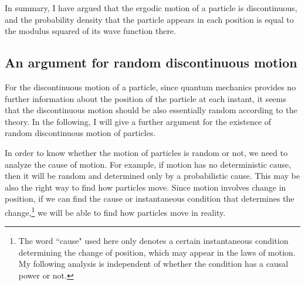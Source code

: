 In summary, I have argued that the ergodic motion of a particle is discontinuous, and the probability density that the particle appears in each position is equal to the modulus squared of its wave function there.

\subsection{An argument for random discontinuous motion}

For the discontinuous motion of a particle, since quantum mechanics provides no further information about the position of the particle at each instant, it seems that the discontinuous motion should be also essentially random according to the theory. 
In the following, I will give a further argument for the existence of random discontinuous motion of particles.

In order to know whether the motion of particles is random or not, we need to analyze the cause of motion. For example, if motion has no deterministic cause, then it will be  random and determined only by a probabilistic cause. This may be also the right way to find how particles move. Since motion involves change in position, if we can find the cause or instantaneous condition that determines the change,\footnote{The word ``cause" used here only denotes a certain instantaneous condition determining the change of position, which may appear in the laws of motion. My following analysis is independent of whether the condition has a causal power or not.} we will be able to find how particles move in reality.

